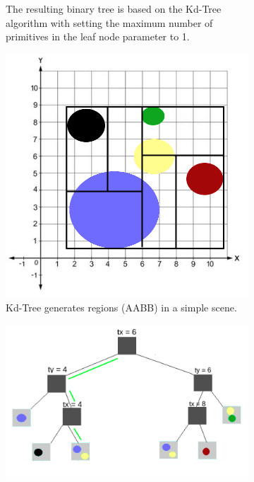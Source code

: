 \documentclass[11pt,a4paper]{article}
\begin{document}
\begin{figure}[H]
\begin{subfigure}[b]{0.6\textwidth}
         \caption{The resulting binary tree is based on the Kd-Tree algorithm with setting the maximum number of primitives in the leaf node parameter to 1.}
         \label{fig:pi_5000}
     \end{subfigure}
     \hfill
     \begin{subfigure}[b]{0.3\textwidth}
         \centering
         \captionsetup{justification=centering}
         \includegraphics[width=\textwidth]{images/kdtree/visaul_scene_2_new.png}
         \caption{Kd-Tree generates regions (AABB) in a simple scene.}
         \label{fig:pi_5000}
     \end{subfigure}
     \hfill
     \begin{subfigure}[b]{0.6\textwidth}
         \centering
         \captionsetup{justification=centering}
         \includegraphics[width=\textwidth]{images/kdtree/visual_tree_2_new.png}

\end{subfigure}
\end{figure}
\end{document}
